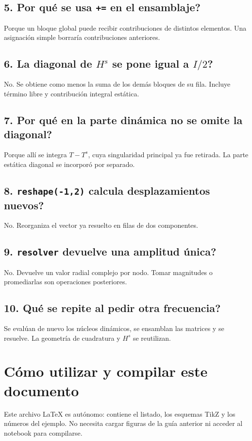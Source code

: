 \documentclass[11pt,a4paper]{article}
\numberwithin{equation}{section}
\begin{document}
\subsection*{5. Por qu\'e se usa \texttt{+=} en el ensamblaje?}
Porque un bloque global puede recibir contribuciones de distintos
elementos. Una asignaci\'on simple borrar\'ia contribuciones anteriores.

\subsection*{6. La diagonal de $H^s$ se pone igual a $I/2$?}
No. Se obtiene como menos la suma de los dem\'as bloques de su fila.
Incluye t\'ermino libre y contribuci\'on integral est\'atica.

\subsection*{7. Por qu\'e en la parte din\'amica no se omite la diagonal?}
Porque all\'i se integra $T-T^s$, cuya singularidad principal ya fue
retirada. La parte est\'atica diagonal se incorpor\'o por separado.

\subsection*{8. \texttt{reshape(-1,2)} calcula desplazamientos nuevos?}
No. Reorganiza el vector ya resuelto en filas de dos componentes.

\subsection*{9. \texttt{resolver} devuelve una amplitud \'unica?}
No. Devuelve un valor radial complejo por nodo.
Tomar magnitudes o promediarlas son operaciones posteriores.

\subsection*{10. Qu\'e se repite al pedir otra frecuencia?}
Se eval\'uan de nuevo los n\'ucleos din\'amicos, se ensamblan las
matrices y se resuelve. La geometr\'ia de cuadratura y $H^s$ se reutilizan.

\section{C\'omo utilizar y compilar este documento}
Este archivo \LaTeX{} es aut\'onomo: contiene el listado, los esquemas
TikZ y los n\'umeros del ejemplo. No necesita cargar figuras de la gu\'ia
anterior ni acceder al notebook para compilarse.
\end{document}
